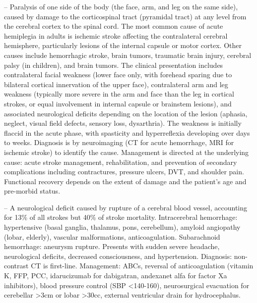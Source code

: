 -- Paralysis of one side of the body (the face, arm, and leg on the same side), caused by damage to the corticospinal tract (pyramidal tract) at any level from the cerebral cortex to the spinal cord. The most common cause of acute hemiplegia in adults is ischemic stroke affecting the contralateral cerebral hemisphere, particularly lesions of the internal capsule or motor cortex. Other causes include hemorrhagic stroke, brain tumors, traumatic brain injury, cerebral palsy (in children), and brain tumors. The clinical presentation includes contralateral facial weakness (lower face only, with forehead sparing due to bilateral cortical innervation of the upper face), contralateral arm and leg weakness (typically more severe in the arm and face than the leg in cortical strokes, or equal involvement in internal capsule or brainstem lesions), and associated neurological deficits depending on the location of the lesion (aphasia, neglect, visual field defects, sensory loss, dysarthria). The weakness is initially flaccid in the acute phase, with spasticity and hyperreflexia developing over days to weeks. Diagnosis is by neuroimaging (CT for acute hemorrhage, MRI for ischemic stroke) to identify the cause. Management is directed at the underlying cause: acute stroke management, rehabilitation, and prevention of secondary complications including contractures, pressure ulcers, DVT, and shoulder pain. Functional recovery depends on the extent of damage and the patient's age and pre-morbid status.

-- A neurological deficit caused by rupture of a cerebral blood vessel, accounting for 13\% of all strokes but 40\% of stroke mortality. Intracerebral hemorrhage: hypertensive (basal ganglia, thalamus, pons, cerebellum), amyloid angiopathy (lobar, elderly), vascular malformations, anticoagulation. Subarachnoid hemorrhage: aneurysm rupture. Presents with sudden severe headache, neurological deficits, decreased consciousness, and hypertension. Diagnosis: non-contrast CT is first-line. Management: ABCs, reversal of anticoagulation (vitamin K, FFP, PCC, idarucizumab for dabigatran, andexanet alfa for factor Xa inhibitors), blood pressure control (SBP <140-160), neurosurgical evacuation for cerebellar >3cm or lobar >30cc, external ventricular drain for hydrocephalus.

